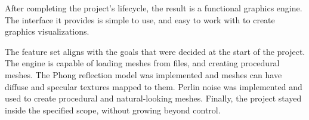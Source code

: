 
After completing the project's lifecycle,
the result is a functional graphics engine.
The interface it provides is simple to use,
and easy to work with to create graphics visualizations.

The feature set aligns with the goals that were decided at the start of the project.
The engine is capable of loading meshes from files,
and creating procedural meshes.
The Phong reflection model was implemented and meshes can have diffuse and specular textures mapped to them.
Perlin noise was implemented and used to create procedural and natural-looking meshes.
Finally,
the project stayed inside the specified scope,
without growing beyond control.
